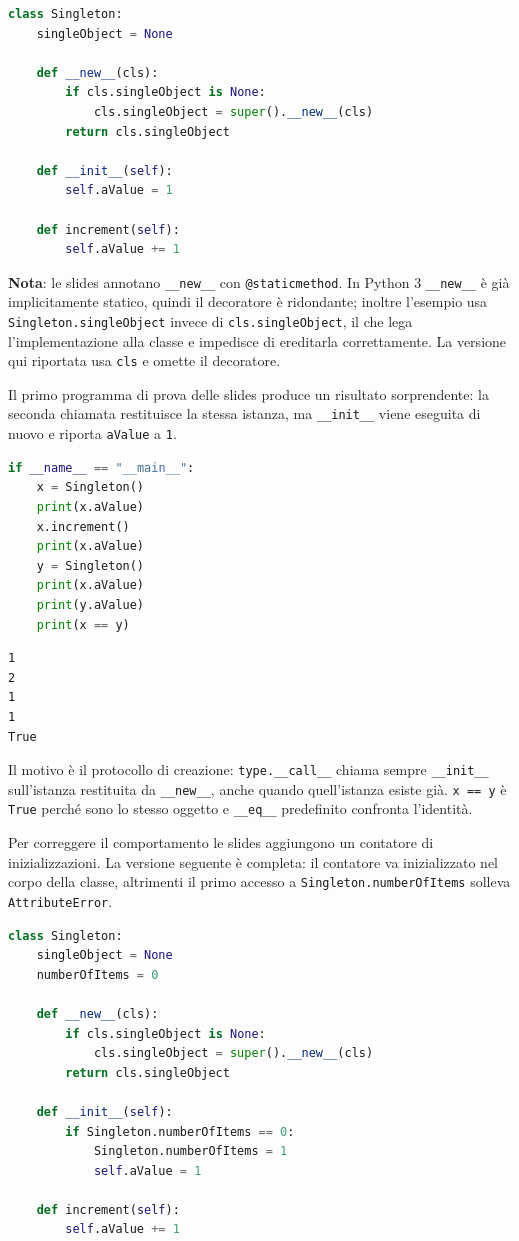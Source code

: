 \documentclass[12pt]{extarticle}
\begin{document}
\begin{lstlisting}[language=Python]
class Singleton:
    singleObject = None

    def __new__(cls):
        if cls.singleObject is None:
            cls.singleObject = super().__new__(cls)
        return cls.singleObject

    def __init__(self):
        self.aValue = 1

    def increment(self):
        self.aValue += 1
\end{lstlisting}

\noindent \textbf{Nota}: le slides annotano \texttt{\_\_new\_\_} con \texttt{@staticmethod}. In Python 3 \texttt{\_\_new\_\_} è già implicitamente statico, quindi il decoratore è ridondante; inoltre l'esempio usa \texttt{Singleton.singleObject} invece di \texttt{cls.singleObject}, il che lega l'implementazione alla classe e impedisce di ereditarla correttamente. La versione qui riportata usa \texttt{cls} e omette il decoratore.

\noindent Il primo programma di prova delle slides produce un risultato sorprendente: la seconda chiamata restituisce la stessa istanza, ma \texttt{\_\_init\_\_} viene eseguita di nuovo e riporta \texttt{aValue} a \texttt{1}.

\begin{lstlisting}[language=Python]
if __name__ == "__main__":
    x = Singleton()
    print(x.aValue)
    x.increment()
    print(x.aValue)
    y = Singleton()
    print(x.aValue)
    print(y.aValue)
    print(x == y)
\end{lstlisting}

\begin{lstlisting}[numbers=none]
1
2
1
1
True
\end{lstlisting}

\noindent Il motivo è il protocollo di creazione: \texttt{type.\_\_call\_\_} chiama sempre \texttt{\_\_init\_\_} sull'istanza restituita da \texttt{\_\_new\_\_}, anche quando quell'istanza esiste già. \texttt{x == y} è \texttt{True} perché sono lo stesso oggetto e \texttt{\_\_eq\_\_} predefinito confronta l'identità.

\noindent Per correggere il comportamento le slides aggiungono un contatore di inizializzazioni. La versione seguente è completa: il contatore va inizializzato nel corpo della classe, altrimenti il primo accesso a \texttt{Singleton.numberOfItems} solleva \texttt{AttributeError}.

\begin{lstlisting}[language=Python]
class Singleton:
    singleObject = None
    numberOfItems = 0

    def __new__(cls):
        if cls.singleObject is None:
            cls.singleObject = super().__new__(cls)
        return cls.singleObject

    def __init__(self):
        if Singleton.numberOfItems == 0:
            Singleton.numberOfItems = 1
            self.aValue = 1

    def increment(self):
        self.aValue += 1
\end{lstlisting}
\end{document}
